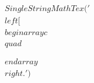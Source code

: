 \documentclass[preview]{standalone}
\begin{document}
\begin{align*}
SingleStringMathTex('\\left[\\begin{array}{c}\\quad \\\\\\end{array}\\right.')
\end{align*}
\end{document}
